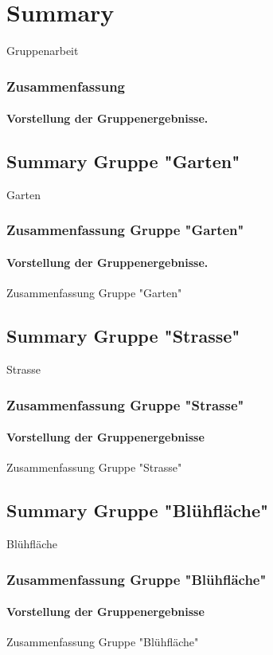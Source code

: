 \documentclass[aspectratio=169]{beamer}
\begin{document}

\section{Summary}

\begin{frame}{Gruppenarbeit}
\frametitle{Zusammenfassung} 
\framesubtitle{Vorstellung der Gruppenergebnisse.}
\end{frame}
\subsection[Garten]{Summary Gruppe "Garten"}


\begin{frame}{Garten}
	\frametitle{Zusammenfassung Gruppe "Garten"} 
	\framesubtitle{Vorstellung der Gruppenergebnisse.}
	Zusammenfassung Gruppe "Garten"
\end{frame}

\subsection[Strasse]{Summary Gruppe "Strasse"}

\begin{frame}{Strasse}
\frametitle{Zusammenfassung Gruppe "Strasse"} 
\framesubtitle{Vorstellung der Gruppenergebnisse}
Zusammenfassung Gruppe "Strasse"
\end{frame}

\subsection[Blühfläche]{Summary Gruppe "Blühfläche"}

\begin{frame}{Blühfläche}
\frametitle{Zusammenfassung Gruppe "Blühfläche"} 
\framesubtitle{Vorstellung der Gruppenergebnisse}
Zusammenfassung Gruppe "Blühfläche"
\end{frame}
\end{document}

